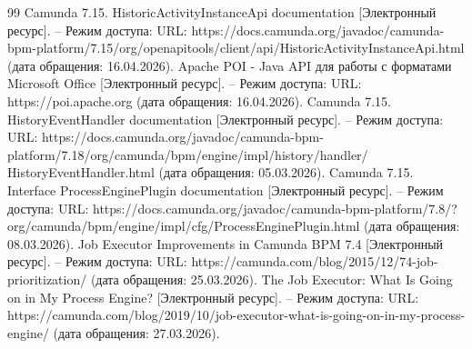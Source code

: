 
\begin{thebibliography}{99}
  Camunda 7.15. HistoricActivityInstanceApi documentation [Электронный ресурс]. – 
  Режим доступа: URL: https://docs.camunda.org/javadoc/camunda-bpm-platform/7.15/org/openapitools/client/api/HistoricActivityInstanceApi.html 
  (дата обращения: 16.04.2026).
  Apache POI - Java API для работы с форматами Microsoft Office [Электронный ресурс]. – 
  Режим доступа: URL: https://poi.apache.org
  (дата обращения: 16.04.2026).
  Camunda 7.15. HistoryEventHandler documentation [Электронный ресурс]. – 
  Режим доступа: URL: https://docs.camunda.org/javadoc/camunda-bpm-platform/7.18/org/camunda/bpm/engine/impl/history/handler/
  HistoryEventHandler.html
  (дата обращения: 05.03.2026).
  Camunda 7.15. Interface ProcessEnginePlugin documentation [Электронный ресурс]. – 
  Режим доступа: URL: https://docs.camunda.org/javadoc/camunda-bpm-platform/7.8/?org/camunda/bpm/engine/impl/cfg/ProcessEnginePlugin.html
  (дата обращения: 08.03.2026).
  Job Executor Improvements in Camunda BPM 7.4 [Электронный ресурс]. – 
  Режим доступа: URL: https://camunda.com/blog/2015/12/74-job-prioritization/
  (дата обращения: 25.03.2026).
  The Job Executor: What Is Going on in My Process Engine? [Электронный ресурс]. – 
  Режим доступа: URL: https://camunda.com/blog/2019/10/job-executor-what-is-going-on-in-my-process-engine/
  (дата обращения: 27.03.2026).

\end{thebibliography}

